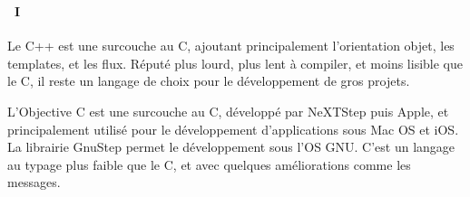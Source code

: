 \begin{frame}
  \frametitle{\secname}
  \framesubtitle{\subsecname~I}
  \par
  Le C++ est une surcouche au C, ajoutant principalement l'orientation objet,
  les templates, et les flux. Réputé plus lourd, plus lent à compiler, et moins lisible
  que le C, il reste un langage de choix pour le développement de gros projets.
  \vspace{0.5cm}
  \par
  L'Objective C est une surcouche au C, développé par NeXTStep puis Apple,
  et principalement utilisé pour le développement d'applications sous Mac OS
  et iOS. La librairie GnuStep permet le développement sous l'OS GNU.
  C'est un langage au typage plus faible que le C, et avec quelques améliorations
  comme les messages.
\end{frame}

